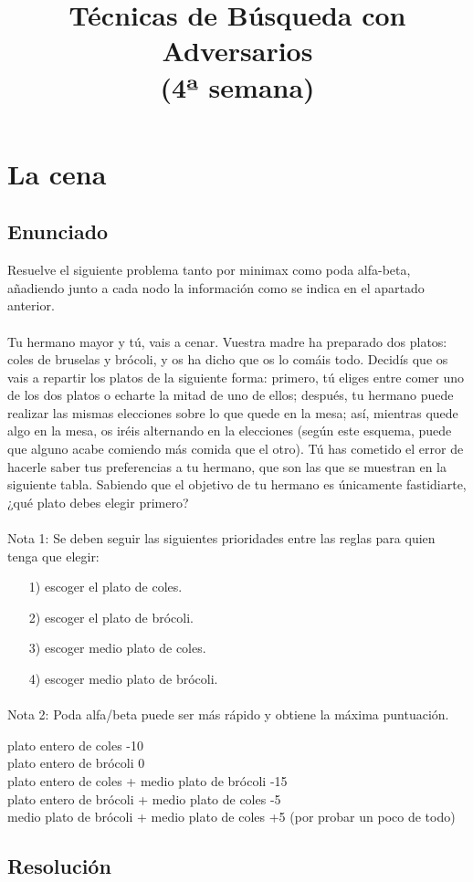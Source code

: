 \documentclass[a4paper,10pt]{article}
\title{Técnicas de Búsqueda con Adversarios\\(4ª semana)}
\author{}
\begin{document}
\maketitle
\pagebreak
\tableofcontents
\pagebreak

\section{La cena}
\subsection{Enunciado}
Resuelve el siguiente problema tanto por minimax como poda alfa-beta, añadiendo junto a cada nodo la información como se indica en el apartado anterior.
\paragraph{}
Tu hermano mayor y tú, vais a cenar. Vuestra madre ha preparado dos platos: coles de bruselas y brócoli, y os ha dicho que os lo comáis todo. Decidís que os vais a repartir los platos de la siguiente forma: primero, tú eliges entre comer uno de los dos platos o echarte la mitad de uno de ellos; después, tu hermano puede realizar las mismas elecciones sobre lo que quede en la mesa; así, mientras quede algo en la mesa, os iréis alternando en la elecciones (según este esquema, puede que alguno acabe comiendo más comida que el otro). Tú has cometido el error de hacerle saber tus preferencias a tu hermano, que son las que se muestran en la siguiente tabla. Sabiendo que el objetivo de tu hermano es únicamente fastidiarte, ¿qué plato debes elegir primero?
\paragraph{}
Nota 1: Se deben seguir las siguientes prioridades entre las reglas para quien tenga que elegir: 
\begin{itemize}
    \item [1)]escoger el plato de coles.
    \item [2)]escoger el plato de brócoli.
    \item [3)]escoger medio plato de coles.
    \item [4)]escoger medio plato de brócoli.
\end{itemize}
\paragraph{}
Nota 2: Poda alfa/beta puede ser más rápido y obtiene la máxima puntuación.

plato entero de coles 	-10\\
plato entero de brócoli 	0\\
plato entero de coles + medio plato de brócoli 	-15\\
plato entero de brócoli + medio plato de coles 	-5\\
medio plato de brócoli + medio plato de coles 	+5 (por probar un poco de todo)\\

\subsection{Resolución}
\end{document}
